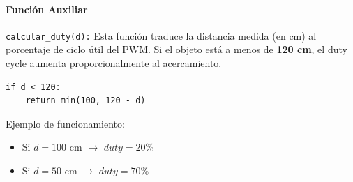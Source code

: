 \documentclass[12pt,a4paper]{article}
\begin{document}
\paragraph{Función Auxiliar}
\begin{itemize}
\texttt{calcular\_duty(d):} Esta función traduce la distancia medida (en cm) al porcentaje de ciclo útil del PWM.  
Si el objeto está a menos de \textbf{120 cm}, el duty cycle aumenta proporcionalmente al acercamiento.

\begin{verbatim}
if d < 120:
    return min(100, 120 - d)
\end{verbatim}

Ejemplo de funcionamiento:
\begin{itemize}
    \item Si $d = 100$ cm $\rightarrow$ $duty = 20\%$
    \item Si $d = 50$ cm $\rightarrow$ $duty = 70\%$
\end{itemize}
\end{itemize}
\end{document}
